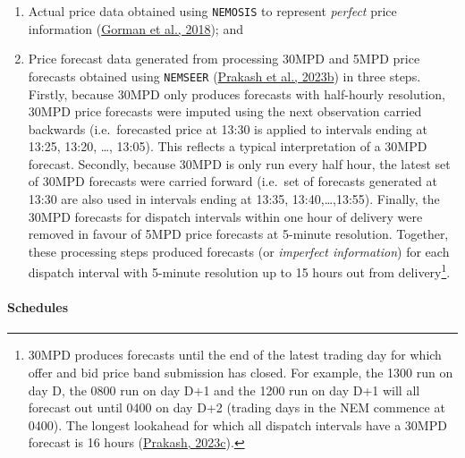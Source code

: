 \documentclass[12pt,a4paper,]{report}
\providecommand{\tightlist}{%
  \setlength{\itemsep}{0pt}\setlength{\parskip}{0pt}}
\begin{document}
\begin{enumerate}
\def\labelenumi{\arabic{enumi}.}
\tightlist
\item
  Actual price data obtained using \texttt{NEMOSIS} to represent
  \emph{perfect} price information
  (\protect\hyperlink{ref-gormanNEMOSISNEMOpen2018}{Gorman et al.,
  2018}); and
\item
  Price forecast data generated from processing 30MPD and 5MPD price
  forecasts obtained using \texttt{NEMSEER}
  (\protect\hyperlink{ref-prakashNEMSEERPythonPackage2023}{Prakash et
  al., 2023b}) in three steps. Firstly, because 30MPD only produces
  forecasts with half-hourly resolution, 30MPD price forecasts were
  imputed using the next observation carried backwards (i.e.~forecasted
  price at 13:30 is applied to intervals ending at 13:25, 13:20, \ldots,
  13:05). This reflects a typical interpretation of a 30MPD forecast.
  Secondly, because 30MPD is only run every half hour, the latest set of
  30MPD forecasts were carried forward (i.e.~set of forecasts generated
  at 13:30 are also used in intervals ending at 13:35,
  13:40,\ldots,13:55). Finally, the 30MPD forecasts for dispatch
  intervals within one hour of delivery were removed in favour of 5MPD
  price forecasts at 5-minute resolution. Together, these processing
  steps produced forecasts (or \emph{imperfect information}) for each
  dispatch interval with 5-minute resolution up to 15 hours out from
  delivery\footnote{30MPD produces forecasts until the end of the latest
    trading day for which offer and bid price band submission has
    closed. For example, the 1300 run on day D, the 0800 run on day D+1
    and the 1200 run on day D+1 will all forecast out until 0400 on day
    D+2 (trading days in the NEM commence at 0400). The longest
    lookahead for which all dispatch intervals have a 30MPD forecast is
    16 hours
    (\protect\hyperlink{ref-prakashLookingPredispatchDemand2023}{Prakash,
    2023c}).}.
\end{enumerate}

\hypertarget{schedules}{%
\paragraph{Schedules}\label{schedules}}
\end{document}
